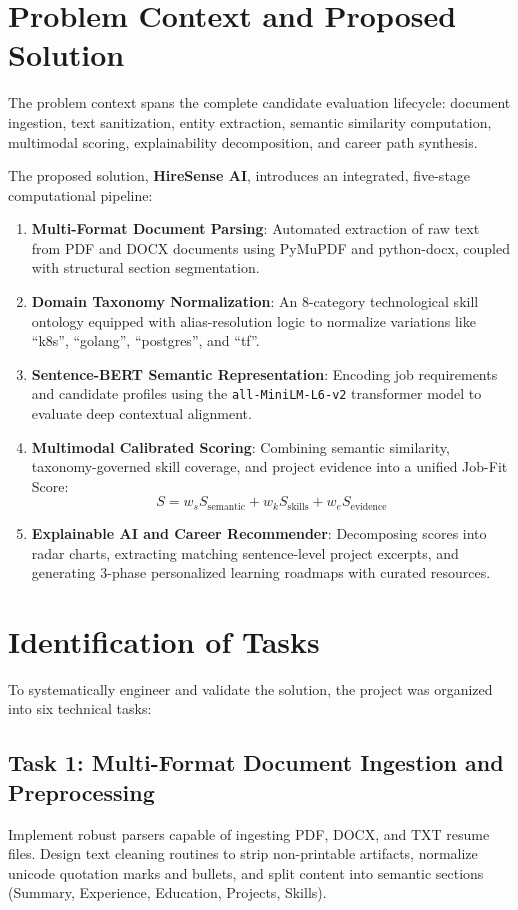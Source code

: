 \documentclass[12pt,a4paper]{report}
\begin{document}
\section{Problem Context and Proposed Solution}
The problem context spans the complete candidate evaluation lifecycle: document ingestion, text sanitization, entity extraction, semantic similarity computation, multimodal scoring, explainability decomposition, and career path synthesis.

The proposed solution, \textbf{HireSense AI}, introduces an integrated, five-stage computational pipeline:
\begin{enumerate}
    \item \textbf{Multi-Format Document Parsing}: Automated extraction of raw text from PDF and DOCX documents using PyMuPDF and python-docx, coupled with structural section segmentation.
    \item \textbf{Domain Taxonomy Normalization}: An 8-category technological skill ontology equipped with alias-resolution logic to normalize variations like ``k8s'', ``golang'', ``postgres'', and ``tf''.
    \item \textbf{Sentence-BERT Semantic Representation}: Encoding job requirements and candidate profiles using the \texttt{all-MiniLM-L6-v2} transformer model to evaluate deep contextual alignment.
    \item \textbf{Multimodal Calibrated Scoring}: Combining semantic similarity, taxonomy-governed skill coverage, and project evidence into a unified Job-Fit Score:
    \begin{equation}
    S = w_s S_{\text{semantic}} + w_k S_{\text{skills}} + w_e S_{\text{evidence}}
    \end{equation}
    \item \textbf{Explainable AI and Career Recommender}: Decomposing scores into radar charts, extracting matching sentence-level project excerpts, and generating 3-phase personalized learning roadmaps with curated resources.
\end{enumerate}

\section{Identification of Tasks}
To systematically engineer and validate the solution, the project was organized into six technical tasks:

\subsection{Task 1: Multi-Format Document Ingestion and Preprocessing}
Implement robust parsers capable of ingesting PDF, DOCX, and TXT resume files. Design text cleaning routines to strip non-printable artifacts, normalize unicode quotation marks and bullets, and split content into semantic sections (Summary, Experience, Education, Projects, Skills).
\end{document}
